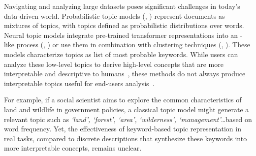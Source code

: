 Navigating and analyzing large datasets poses significant challenges in today's data-driven world.
%
Probabilistic topic models (\lda{}, \citealt{blei2003lda}) represent documents as mixtures of topics, with topics defined as probabilistic distributions over words. Neural topic models integrate pre-trained transformer representations into an \lda{}-like process (\ctm{}, \citealt{bianchi2020pre}) or use them in combination with clustering techniques (\bertopic{}, \citealt{bertopicMark}). 
%
These models characterize topics as list of most probable keywords. %
%
While users can analyze these low-level topics to derive high-level concepts that are more interpretable and descriptive to humans~\cite{Asmussen2019SmartLR}, these methods do not always produce interpretable topics useful for end-users analysis~\cite{hoyle2021automated}. %

For example, if a social scientist aims to explore the common characteristics of land and wildlife in government policies, a classical topic model might generate a relevant topic such as \textit{`land', `forest', `area', `wilderness', `management'}\dots based on word frequency.
%
Yet, the effectiveness of keyword-based topic representation in real tasks, compared to discrete descriptions that synthesize these keywords into more interpretable concepts, remains unclear.


